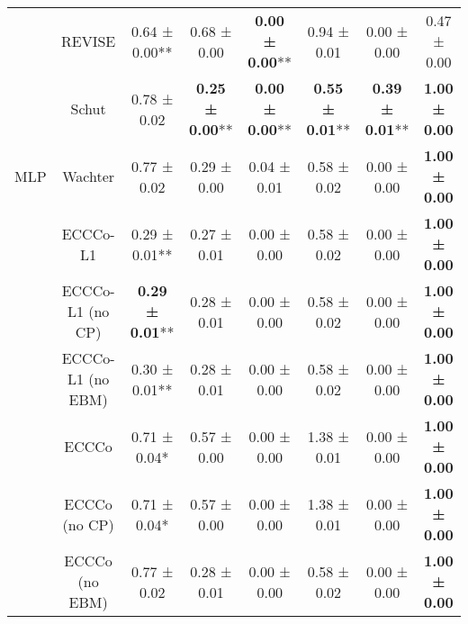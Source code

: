 \begin{table}
{\begin{tabular}[t]{cccccccc}
 & REVISE & 0.64 ± 0.00** & 0.68 ± 0.00\hphantom{*}\hphantom{*} & \textbf{0.00 ± 0.00}** & 0.94 ± 0.01\hphantom{*}\hphantom{*} & 0.00 ± 0.00\hphantom{*}\hphantom{*} & 0.47 ± 0.00\hphantom{*}\hphantom{*}\\

 & Schut & 0.78 ± 0.02\hphantom{*}\hphantom{*} & \textbf{0.25 ± 0.00}** & \textbf{0.00 ± 0.00}** & \textbf{0.55 ± 0.01}** & \textbf{0.39 ± 0.01}** & \textbf{1.00 ± 0.00}\hphantom{*}\hphantom{*}\\

\multirow[t]{-9}{*}{\centering\arraybackslash MLP} & Wachter & 0.77 ± 0.02\hphantom{*}\hphantom{*} & 0.29 ± 0.00\hphantom{*}\hphantom{*} & 0.04 ± 0.01\hphantom{*}\hphantom{*} & 0.58 ± 0.02\hphantom{*}\hphantom{*} & 0.00 ± 0.00\hphantom{*}\hphantom{*} & \textbf{1.00 ± 0.00}\hphantom{*}\hphantom{*}\\
\cmidrule{1-8}
 & ECCCo-L1 & 0.29 ± 0.01** & 0.27 ± 0.01\hphantom{*}\hphantom{*} & 0.00 ± 0.00\hphantom{*}\hphantom{*} & 0.58 ± 0.02\hphantom{*}\hphantom{*} & 0.00 ± 0.00\hphantom{*}\hphantom{*} & \textbf{1.00 ± 0.00}\hphantom{*}\hphantom{*}\\

 & ECCCo-L1 (no CP) & \textbf{0.29 ± 0.01}** & 0.28 ± 0.01\hphantom{*}\hphantom{*} & 0.00 ± 0.00\hphantom{*}\hphantom{*} & 0.58 ± 0.02\hphantom{*}\hphantom{*} & 0.00 ± 0.00\hphantom{*}\hphantom{*} & \textbf{1.00 ± 0.00}\hphantom{*}\hphantom{*}\\

 & ECCCo-L1 (no EBM) & 0.30 ± 0.01** & 0.28 ± 0.01\hphantom{*}\hphantom{*} & 0.00 ± 0.00\hphantom{*}\hphantom{*} & 0.58 ± 0.02\hphantom{*}\hphantom{*} & 0.00 ± 0.00\hphantom{*}\hphantom{*} & \textbf{1.00 ± 0.00}\hphantom{*}\hphantom{*}\\

 & ECCCo & 0.71 ± 0.04*\hphantom{*} & 0.57 ± 0.00\hphantom{*}\hphantom{*} & 0.00 ± 0.00\hphantom{*}\hphantom{*} & 1.38 ± 0.01\hphantom{*}\hphantom{*} & 0.00 ± 0.00\hphantom{*}\hphantom{*} & \textbf{1.00 ± 0.00}\hphantom{*}\hphantom{*}\\

 & ECCCo (no CP) & 0.71 ± 0.04*\hphantom{*} & 0.57 ± 0.00\hphantom{*}\hphantom{*} & 0.00 ± 0.00\hphantom{*}\hphantom{*} & 1.38 ± 0.01\hphantom{*}\hphantom{*} & 0.00 ± 0.00\hphantom{*}\hphantom{*} & \textbf{1.00 ± 0.00}\hphantom{*}\hphantom{*}\\

 & ECCCo (no EBM) & 0.77 ± 0.02\hphantom{*}\hphantom{*} & 0.28 ± 0.01\hphantom{*}\hphantom{*} & 0.00 ± 0.00\hphantom{*}\hphantom{*} & 0.58 ± 0.02\hphantom{*}\hphantom{*} & 0.00 ± 0.00\hphantom{*}\hphantom{*} & \textbf{1.00 ± 0.00}\hphantom{*}\hphantom{*}\\


\end{tabular}}
\end{table}
